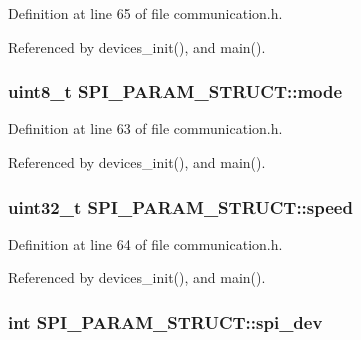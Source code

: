Definition at line 65 of file communication.\-h.



Referenced by devices\-\_\-init(), and main().

\hypertarget{structSPI__PARAM__STRUCT_a82c546c99f6c3daed73c1e23426be847}{
\subsubsection[{mode}]{\setlength{\rightskip}{0pt plus 5cm}uint8\-\_\-t S\-P\-I\-\_\-\-P\-A\-R\-A\-M\-\_\-\-S\-T\-R\-U\-C\-T\-::mode}}\label{structSPI__PARAM__STRUCT_a82c546c99f6c3daed73c1e23426be847}


Definition at line 63 of file communication.\-h.



Referenced by devices\-\_\-init(), and main().

\hypertarget{structSPI__PARAM__STRUCT_a53a8d386594a81eb9bc6f971bfe36c54}{
\subsubsection[{speed}]{\setlength{\rightskip}{0pt plus 5cm}uint32\-\_\-t S\-P\-I\-\_\-\-P\-A\-R\-A\-M\-\_\-\-S\-T\-R\-U\-C\-T\-::speed}}\label{structSPI__PARAM__STRUCT_a53a8d386594a81eb9bc6f971bfe36c54}


Definition at line 64 of file communication.\-h.



Referenced by devices\-\_\-init(), and main().

\hypertarget{structSPI__PARAM__STRUCT_abe385c44333d268d17cf648c8e371cad}{
\subsubsection[{spi\-\_\-dev}]{\setlength{\rightskip}{0pt plus 5cm}int S\-P\-I\-\_\-\-P\-A\-R\-A\-M\-\_\-\-S\-T\-R\-U\-C\-T\-::spi\-\_\-dev}}\label{structSPI__PARAM__STRUCT_abe385c44333d268d17cf648c8e371cad}


